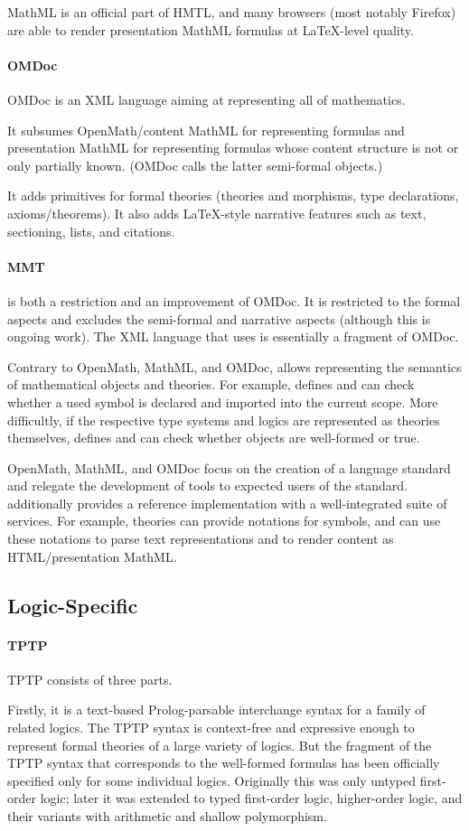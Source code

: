 \documentclass[12pt]{article}
\newcommand{\system}[2][]{\paragraph{#2}#2 \ifnonempty[\cite{#2}]{#1}{\cite{#1}}}
\begin{document}
MathML is an official part of HMTL, and many browsers (most notably Firefox) are able to render presentation MathML formulas at LaTeX-level quality.

\system{OMDoc} is an XML language aiming at representing all of mathematics.

It subsumes OpenMath/content MathML for representing formulas and presentation MathML for representing formulas whose content structure is not or only partially known. (OMDoc calls the latter semi-formal objects.)

It adds primitives for formal theories (theories and morphisms, type declarations, axioms/theorems).
It also adds LaTeX-style narrative features such as text, sectioning, lists, and citations.

\paragraph{MMT}
\mmt is both a restriction and an improvement of OMDoc.
It is restricted to the formal aspects and excludes the semi-formal and narrative aspects (although this is ongoing work).
The XML language that \mmt uses is essentially a fragment of OMDoc.

Contrary to OpenMath, MathML, and OMDoc, \mmt allows representing the semantics of mathematical objects and theories.
For example, \mmt defines and can check whether a used symbol is declared and imported into the current scope.
More difficultly, if the respective type systems and logics are represented as \mmt theories themselves, \mmt defines and can check whether objects are well-formed or true.

OpenMath, MathML, and OMDoc focus on the creation of a language standard and relegate the development of tools to expected users of the standard.
\mmt additionally provides a reference implementation with a well-integrated suite of services.
For example, \mmt theories can provide notations for symbols, and \mmt can use these notations to parse text representations and to render content as HTML/presentation MathML.

\subsection{Logic-Specific}

\system{TPTP} consists of three parts.

Firstly, it is a text-based Prolog-parsable interchange syntax for a family of related logics.
The TPTP syntax is context-free and expressive enough to represent formal theories of a large variety of logics.
But the fragment of the TPTP syntax that corresponds to the well-formed formulas has been officially specified only for some individual logics.
Originally this was only untyped first-order logic; later it was extended to typed first-order logic, higher-order logic, and their variants with arithmetic and shallow polymorphism.
\end{document}
